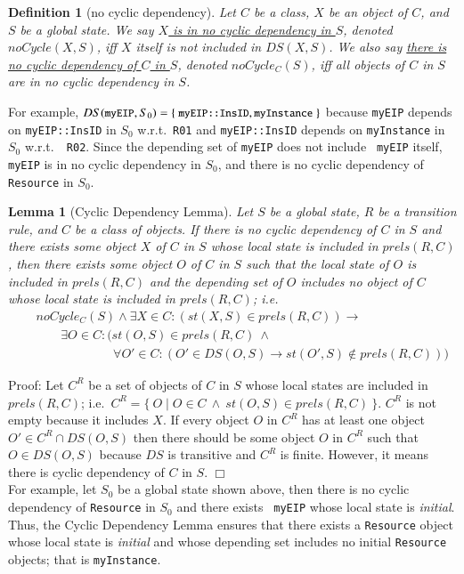 \documentclass[12pt]{report}
\newtheorem{lemma}{Lemma}
\newtheorem{definition}{Definition}
\newcommand{\ra}{\rightarrow}
\newcommand{\mbstt}[1]{\mbox{\small{\tt {#1}}}}
\newcommand{\stt}[1]{{\small{\tt {#1}}}}
\newcommand{\ul}{\underline}
\begin{document}
\begin{definition}[no cyclic dependency]
Let $C$ be a class, $X$ be an object of $C$, and $S$ be a global
state. We say \ul{$X$ is in no cyclic dependency in $S$}, denoted
\ul{$noCycle(X,S)$}, iff $X$ itself is not included in $DS(X,S)$. We
also say \ul{there is no cyclic dependency of $C$ in $S$}, denoted
\ul{$noCycle_C(S)$}, iff all objects of $C$ in $S$ are in no cyclic
dependency in $S$.
\end{definition}
For example, $DS(\mbstt{myEIP},S_0) =
\{~\mbstt{myEIP::InsID},\mbstt{myInstance}~\}$ because {\tt myEIP}
depends on \stt{myEIP::InsID} in $S_0$ w.r.t.\ {\tt R01} and
\stt{myEIP::InsID} depends on {\tt myInstance} in $S_0$ w.r.t.\ {\tt
  R02}. Since the depending set of {\tt myEIP} does not include {\tt
  myEIP} itself, {\tt myEIP} is in no cyclic dependency in $S_0$, and
there is no cyclic dependency of {\tt Resource} in $S_0$.
\begin{lemma}[Cyclic Dependency Lemma]
Let $S$ be a global state, $R$ be a transition rule, and $C$ be a
class of objects. If there is no cyclic dependency of $C$ in $S$
and there exists some object $X$ of $C$ in $S$ whose local state
is included in $prels(R,C)$, then there exists some object $O$ of $C$ in
$S$ such that the local state of $O$ is included in $prels(R,C)$ and the
depending set of $O$ includes no object of $C$ whose local
state is included in $prels(R,C)$; i.e.
\begin{eqnarray*}
&&noCycle_C(S)\land\exists X\in C:(st(X,S)\in prels(R,C)) \ra\\
&&\:\:\:\:\:\:\:\:\:\exists O\in C:(st(O,S)\in prels(R,C)\ \land\\
&&\:\:\:\:\:\:\:\:\:\:\:\:\:\:\:\:\:\:\:\:\:\:\:\:\:\:\:\:
\forall O'\in C:(O'\in DS(O,S)\ra st(O',S)\not\in prels(R,C)))
\end{eqnarray*}
\end{lemma}
Proof: Let $C^R$ be a set of objects of $C$ in $S$ whose local states
are included in $prels(R,C)$; i.e.\ $C^R=\{~O\mid O\in C~\land~
st(O,S)\in prels(R,C)~\}$. $C^R$ is not empty because it includes $X$.
If every object $O$ in $C^R$ has at least one object $O' \in C^R\cap
DS(O,S)$ then there should be some object $O$ in $C^R$ such that $O
\in DS(O,S)$ because $DS$ is transitive and $C^R$ is finite. However,
it means there is cyclic dependency of $C$ in $S$. $\Box$\\

\noindent
For example, let $S_0$ be a global state shown above, then there is no
cyclic dependency of {\tt Resource} in $S_0$ and there exists {\tt
  myEIP} whose local state is {\it initial}. Thus, the Cyclic
Dependency Lemma ensures that there exists a {\tt Resource} object
whose local state is {\it initial} and whose depending set includes no
initial {\tt Resource} objects; that is {\tt myInstance}.
\end{document}
